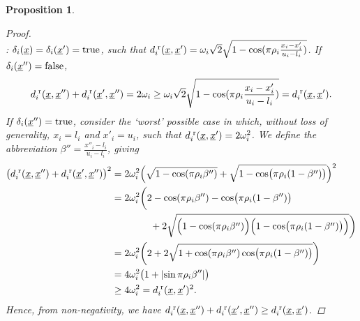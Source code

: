 \documentclass[letterpaper]{article}
\newcommand{\vect}[1]{\underline{\smash{#1}}}
\renewcommand{\v}[1]{\vect{#1}}
\newcommand{\br}{^{\text{\textnormal{ r}}}}
\newtheorem{prop}[thm]{Proposition}
\begin{document}
\begin{prop}
\begin{proof}
~\\: $\delta_i(\v{x}) = \delta_i(\v{x}')=\textrm{true}$, such that  $d\br_i(\v{x},\v{x}') = \omega_i \sqrt{2} \sqrt{1 - \cos(\pi\rho_i \frac{x_i-x_i'}{u_i-l_i})}$.  If  $\delta_i(\v{x}'') = \text{false}$,
\begin{align}
d\br_i(\v{x},\v{x}'') + d\br_i(\v{x}',\v{x}'') = 2 \omega_i \geq \omega_i \sqrt{2} \sqrt{1 - \cos(\pi\rho_i \frac{x_i-x_i'}{u_i-l_i})} = d\br_i(\v{x},\v{x}').
\end{align} 
If  $\delta_i(\v{x}'') = \text{true}$, consider the `worst' possible case in which, without loss of generality, $x_i=l_i$ and $x'_i=u_i$, such that $d\br_i(\v{x},\v{x}')=2 \omega_i^2$.  We define the abbreviation $\beta'' = \frac{x''_i-l_i}{u_i-l_i}$, giving
\begin{align}
\bigl(d\br_i(\v{x},\v{x}'') + d\br_i(\v{x}',\v{x}'')\bigr)^2
& = 2\omega_i^2 \Bigl(\sqrt{1 - \cos (\pi\rho_i \beta'')} + \sqrt{1 - \cos \bigl(\pi\rho_i (1-\beta'')\bigr)}\Bigr)^2\nonumber\\
&=2\omega_i^2\biggl(2 - \cos (\pi\rho_i \beta'') - \cos \bigl(\pi\rho_i (1-\beta'')\bigr)
\nonumber\\
&\qquad\qquad+2\sqrt{\Bigl(1 - \cos (\pi\rho_i \beta'')\Bigr)\Bigl(1 - \cos \bigl(\pi\rho_i (1-\beta'')\bigr)\Bigr)}\biggr)\nonumber\\
&=2\omega_i^2\biggl(2 +2\sqrt{1 + \cos (\pi\rho_i \beta'')\cos \bigl(\pi\rho_i (1-\beta'')\bigr)}\biggr)\nonumber\\
&=4 \omega_i^2 \bigl(1 + \left|\sin \pi\rho_i \beta'' \right|\bigr)\nonumber\\
&\geq 4 \omega_i^2 = d\br_i(\v{x},\v{x}')^2.
\end{align}
Hence, from non-negativity, we have $d\br_i(\v{x},\v{x}'') + d\br_i(\v{x}',\v{x}'')\geq d\br_i(\v{x},\v{x}')$.
\end{proof}
\end{prop}
\end{document}
